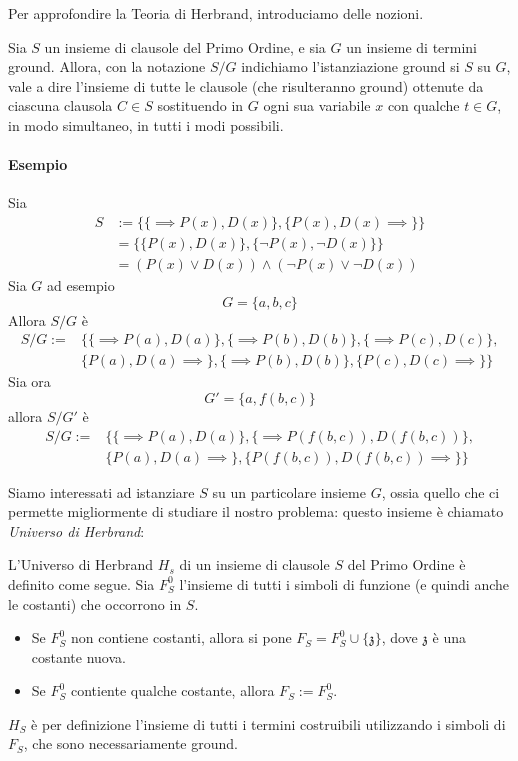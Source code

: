 Per approfondire la Teoria di Herbrand, introduciamo delle nozioni. 

\begin{defi}
        Sia $S$ un insieme di clausole del Primo Ordine, e sia $G$ un insieme 
        di termini ground. Allora, con la notazione $S/G$ indichiamo l'istanziazione 
        ground si $S$ su $G$, vale a dire l'insieme di tutte le clausole 
        (che risulteranno ground) ottenute da ciascuna clausola $C \in S$ sostituendo 
        in $G$ ogni sua variabile $x$ con qualche $t \in G$, in modo simultaneo, 
        in tutti i modi possibili.
\end{defi}
\paragraph{Esempio}
Sia 
\begin{align*}
        S &:= \{\{\implies P(x),D(x)\}, \{P(x), D(x) \implies\}\} \\
          &= \{\{P(x), D(x)\}, \{\neg P(x), \neg D(x)\}\} \\
          &= (P(x) \lor D(x)) \land (\neg P(x) \lor \neg D(x))
\end{align*}
Sia $G$ ad esempio 
$$
G = \{a, b, c\}
$$
Allora $S/G$ è 
\begin{align*}
S/G := &\{\{\implies P(a),D(a)\}, \{\implies P(b), D(b)\}, \{\implies P(c), D(c)\}, \\
       &\{P(a),D(a) \implies\},\{\implies P(b),D(b)\},\{P(c),D(c) \implies\}\}
\end{align*}
Sia ora 
$$
G' = \{a, f(b,c)\}
$$
allora $S/G'$ è 
\begin{align*}
        S/G := &\{\{\implies P(a),D(a)\}, \{\implies P(f(b,c)), D(f(b,c))\}, \\
               &\{P(a),D(a) \implies\},\{P(f(b,c)),D(f(b,c)) \implies\}\}
\end{align*}


\noindent 
Siamo interessati ad istanziare $S$ su un particolare insieme $G$, ossia quello 
che ci permette migliormente di studiare il nostro problema: questo 
insieme è chiamato \textit{Universo di Herbrand}: 
\begin{defi}
        L'Universo di Herbrand $H_s$ di un insieme di clausole $S$ del 
        Primo Ordine è definito come segue. 
        Sia $F^0_S$ l'insieme di tutti i simboli di funzione 
                        (e quindi anche le costanti) che occorrono in $S$. 

        \begin{itemize}
                \item Se $F^0_S$ non contiene costanti, allora si 
                        pone $F_S = F^0_S \cup \{\mathfrak{z}\}$, 
                        dove $\mathfrak{z}$ è una costante nuova. 
                \item Se $F^0_S$ contiente qualche costante, allora $F_S := F^0_S$. 
        \end{itemize}
        $H_S$ è per definizione l'insieme di tutti i termini costruibili utilizzando 
        i simboli di $F_S$, che sono necessariamente ground. 
\end{defi}

